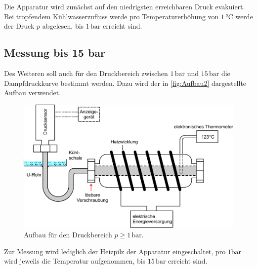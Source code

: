 Die Apparatur wird zunächst auf den niedrigsten erreichbaren Druck evakuiert.
Bei tropfendem Kühlwasserzufluss werde pro Temperaturerhöhung von $1 \,\unit{\celsius}$
werde der Druck $p$ abgelesen, bis $1 \,\unit{\bar}$ erreicht sind.


\subsection{Messung bis 15 bar}

Des Weiteren soll auch für den Druckbereich zwischen $1 \,\unit{\bar}$ und $15 \,\unit{\bar}$ die 
Dampfdruckkurve bestimmt werden.
Dazu wird der in \autoref{fig:Aufbau2} dargestellte Aufbau verwendet.

\begin{figure}[H]
    \centering
    \includegraphics{Aufbau 2.pdf}
    \caption{Aufbau für den Druckbereich $p \geq 1 \,\unit{\bar}$\cite{ap06}.}
    \label{fig:Aufbau2}
\end{figure}

Zur Messung wird lediglich der Heizpilz der Apparatur eingeschaltet, pro $1 \unit{\bar}$ wird jeweils die
Temperatur aufgenommen, bis $15 \,\unit{\bar}$ erreicht sind.


